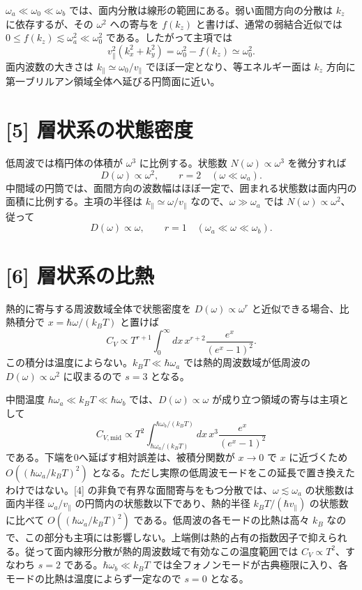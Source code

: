 \documentclass[11pt,a4paper]{article}
\begin{document}
$\omega_a\ll\omega_0\ll\omega_b$ では、面内分散は線形の範囲にある。弱い面間方向の分散は $k_z$ に依存するが、その $\omega^2$ への寄与を $f(k_z)$ と書けば、通常の弱結合近似では $0\le f(k_z)\lesssim\omega_a^2\ll\omega_0^2$ である。したがって主項では
\begin{equation}
 v_\parallel^2(k_x^2+k_y^2)=\omega_0^2-f(k_z)\simeq\omega_0^2.
\end{equation}
面内波数の大きさは $k_\parallel\simeq\omega_0/v_\parallel$ でほぼ一定となり、等エネルギー面は $k_z$ 方向に第一ブリルアン領域全体へ延びる円筒面に近い。

\section*{[5] 層状系の状態密度}
低周波では楕円体の体積が $\omega^3$ に比例する。状態数 $N(\omega)\propto\omega^3$ を微分すれば
\begin{equation}
 D(\omega)\propto\omega^2,\qquad r=2\quad(\omega\ll\omega_a).
\end{equation}
中間域の円筒では、面間方向の波数幅はほぼ一定で、囲まれる状態数は面内円の面積に比例する。主項の半径は $k_\parallel\simeq\omega/v_\parallel$ なので、$\omega\gg\omega_a$ では $N(\omega)\propto\omega^2$、従って
\begin{equation}
 D(\omega)\propto\omega,\qquad r=1\quad(\omega_a\ll\omega\ll\omega_b).
\end{equation}

\section*{[6] 層状系の比熱}
熱的に寄与する周波数域全体で状態密度を $D(\omega)\propto\omega^r$ と近似できる場合、比熱積分で $x=\hbar\omega/(k_BT)$ と置けば
\begin{equation}
 C_V\propto T^{r+1}\int_0^\infty dx\,x^{r+2}\frac{e^x}{(e^x-1)^2}.
\end{equation}
この積分は温度によらない。$k_BT\ll\hbar\omega_a$ では熱的周波数域が低周波の $D(\omega)\propto\omega^2$ に収まるので $s=3$ となる。

中間温度 $\hbar\omega_a\ll k_BT\ll\hbar\omega_b$ では、$D(\omega)\propto\omega$ が成り立つ領域の寄与は主項として
\begin{equation}
 C_{V,\mathrm{mid}}\propto T^2
 \int_{\hbar\omega_a/(k_BT)}^{\hbar\omega_b/(k_BT)}
 dx\,x^3\frac{e^x}{(e^x-1)^2}
\end{equation}
である。下端を0へ延ばす相対誤差は、被積分関数が $x\to0$ で $x$ に近づくため $O((\hbar\omega_a/k_BT)^2)$ となる。ただし実際の低周波モードをこの延長で置き換えたわけではない。[4] の非負で有界な面間寄与をもつ分散では、$\omega\lesssim\omega_a$ の状態数は面内半径 $\omega_a/v_\parallel$ の円筒内の状態数以下であり、熱的半径 $k_BT/(\hbar v_\parallel)$ の状態数に比べて $O((\hbar\omega_a/k_BT)^2)$ である。低周波の各モードの比熱は高々 $k_B$ なので、この部分も主項には影響しない。上端側は熱的占有の指数因子で抑えられる。従って面内線形分散が熱的周波数域で有効なこの温度範囲では $C_V\propto T^2$、すなわち $s=2$ である。$\hbar\omega_b\ll k_BT$ では全フォノンモードが古典極限に入り、各モードの比熱は温度によらず一定なので $s=0$ となる。
\end{document}
